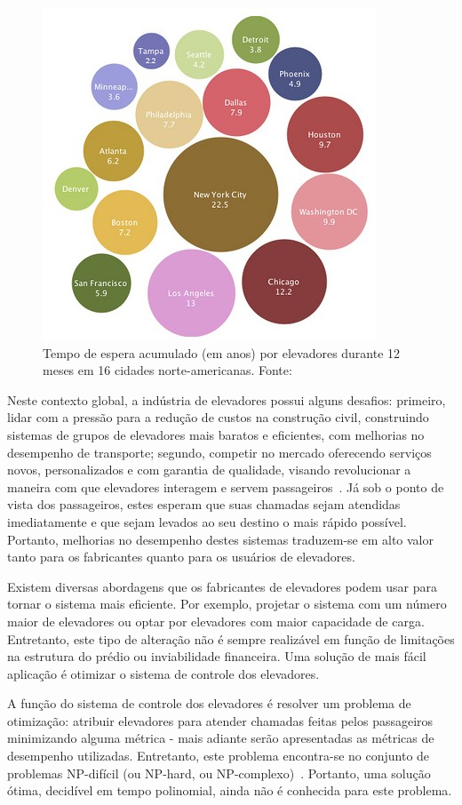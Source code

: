 \begin{figure}[htb!]
\centering\includegraphics{img/time-cost.jpg}
\caption{\label{fig:fig1}Tempo de espera acumulado (em anos) por elevadores durante 12 meses em 16 cidades norte-americanas. Fonte:~\cite{IBM10}}
\end{figure}

Neste contexto global, a indústria de elevadores possui alguns desafios: primeiro, lidar com a pressão para a redução de custos na construção civil, construindo sistemas de grupos de elevadores mais baratos e eficientes, com melhorias no desempenho de transporte; segundo, competir no mercado oferecendo serviços novos, personalizados e com garantia de qualidade, visando revolucionar a maneira com que elevadores interagem e servem passageiros~\cite{KOEHLEROTTIGER02}. Já sob o ponto de vista dos passageiros, estes esperam que suas chamadas sejam atendidas imediatamente e que sejam levados ao seu destino o mais rápido possível. Portanto, melhorias no desempenho destes sistemas traduzem-se em alto valor tanto para os fabricantes quanto para os usuários de elevadores.

Existem diversas abordagens que os fabricantes de elevadores podem usar para tornar o sistema mais eficiente. Por exemplo, projetar o sistema com um número maior de elevadores ou optar por elevadores com maior capacidade de carga. Entretanto, este tipo de alteração não é sempre realizável em função de limitações na estrutura do prédio ou inviabilidade financeira. Uma solução de mais fácil aplicação é otimizar o sistema de controle dos elevadores.

A função do sistema de controle dos elevadores é resolver um problema de otimização: atribuir elevadores para atender chamadas feitas pelos passageiros minimizando alguma métrica - mais adiante serão apresentadas as métricas de desempenho utilizadas. Entretanto, este problema encontra-se no conjunto de problemas NP-difícil (ou NP-hard, ou NP-complexo)~\cite{SeKo99}. Portanto, uma solução ótima, decidível em tempo polinomial, ainda não é conhecida para este problema.

